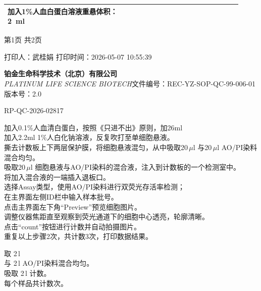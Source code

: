 \documentclass[UTF8,10pt,a4paper,fontset=fandol]{ctexart}
\newcommand{\fieldvalue}[1]{#1}
\newcommand{\handwritten}[1]{#1}
\begin{document}
\begin{center}
\begin{tabular}{|p{0.53\linewidth}|p{0.39\linewidth}|}
加入1\%人血白蛋白溶液重悬体积：
\fieldvalue{\handwritten{2}}\ ml \\
\hline
\end{tabular}
\end{center}

\begin{center}
第1页 共2页
\end{center}

\noindent
打印人：武桂娟 \hfill 打印时间：2026-05-07 10:55:39

\newpage

\noindent
\textbf{铂金生命科学技术（北京）有限公司}\\
\textit{PLATINUM LIFE SCIENCE BIOTECH}\hfill 文件编号：REC-YZ-SOP-QC-99-006-01\quad 版本号：2.0

\begin{flushright}
RP-QC-2026-02817
\end{flushright}

\begin{minipage}{0.56\linewidth}
加入0.1\%人血清白蛋白，按照《只进不出》原则，加26ml
\\[2pt]
加入2.2ml 1\%人白化钠溶液，反复吹打至单细胞悬液。
\\[2pt]
撕去计数板上下两层保护膜，将细胞悬液混匀，从中吸取20\,$\mu$l 与20\,$\mu$l AO/PI染料混合均匀。
\\[2pt]
吸取20\,$\mu$l 细胞悬液与AO/PI染料的混合液，注入到计数板的一个检测室中。
\\[2pt]
将加入混合液的一端插入退板口。
\\[2pt]
选择Assay类型，使用AO/PI染料进行双荧光存活率检测；
\\[2pt]
在主界面左侧ID栏中输入样本批号。
\\[2pt]
点击主界面左下角“Preview”预览细胞图片。
\\[2pt]
调整仪器焦距直至观察到荧光通道下的细胞中心透亮，轮廓清晰。
\\[2pt]
点击“count”按钮进行计数并自动拍摄图片。
\\[2pt]
重复以上步骤2次，共计数3次，打印数据结果。
\end{minipage}
\hfill
\begin{minipage}{0.39\linewidth}
取
\fieldvalue{\handwritten{2}}\,\mu l
\\[6pt]
与
\fieldvalue{\handwritten{2}}\,\mu l AO/PI染料混合均匀。
\\[6pt]
吸取
\fieldvalue{\handwritten{2}}\,\mu l 计数。
\\[6pt]
每个样品共计数\underline{\hspace{1.5cm}}次。
\end{minipage}
\end{document}
